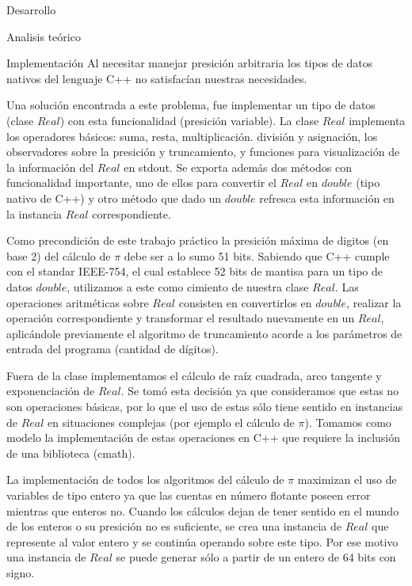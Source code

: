 \begin{section}{Desarrollo}
	\begin{subsection}{Analisis teórico}
			
		
		\newpage
		
		\newpage
		
		
	\end{subsection}
	\begin{subsection}{Implementación}
		Al necesitar manejar presición arbitraria los tipos de datos nativos del lenguaje C++ no satisfacían nuestras necesidades.
		
		Una solución encontrada a este problema, fue implementar un tipo de datos (clase $Real$) con esta funcionalidad (presición variable). La clase $Real$ implementa los operadores básicos: suma, resta, multiplicación. división y asignación, los observadores sobre la presición y truncamiento, y funciones para visualización de la información del $Real$ en stdout. Se exporta además dos métodos con funcionalidad importante, uno de ellos para convertir el $Real$ en $double$ (tipo nativo de C++) y otro método que dado un $double$ refresca esta información en la instancia $Real$ correspondiente.
		
		Como precondición de este trabajo práctico la presición máxima de digitos (en base 2) del cálculo de $\pi$ debe ser a lo sumo 51 bits.
		Sabiendo que C++ cumple con el standar IEEE-754, el cual establece 52 bits de mantisa para un tipo de datos $double$, utilizamos a este como cimiento de nuestra clase $Real$. Las operaciones aritméticas sobre $Real$ consisten en convertirlos en $double$, realizar la operación correspondiente y transformar el resultado nuevamente en un $Real$, aplicándole previamente el algoritmo de truncamiento
		acorde a los parámetros de entrada del programa (cantidad de dígitos).
		
		Fuera de la clase implementamos el cálculo de raíz cuadrada, arco tangente y exponenciación de $Real$. Se tomó esta decisión ya que consideramos que estas no son operaciones básicas, por lo que el uso de estas sólo tiene sentido en instancias de $Real$ en situaciones complejas (por ejemplo el cálculo de $\pi$). Tomamos como modelo la implementación de estas operaciones en C++ que requiere la inclusión de una biblioteca (cmath).
		
		 La implementación de todos los algoritmos del cálculo de $\pi$ maximizan el uso de variables de tipo entero ya que las cuentas en número flotante poseen error mientras que enteros no. Cuando los cálculos dejan de tener sentido en el mundo de los enteros o su presición no es suficiente, se crea una instancia de $Real$ que represente al valor entero y se continúa operando sobre este tipo. Por ese motivo una instancia de $Real$ se puede generar sólo a partir de un entero de 64 bits con signo.\\
		   

\end{subsection}
\end{section}
